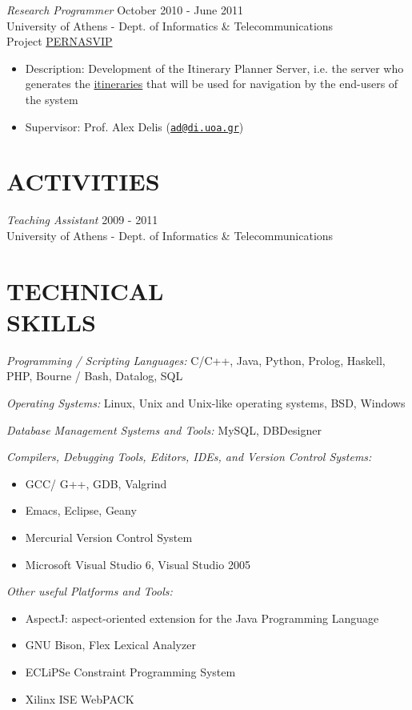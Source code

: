 \documentclass[margin]{res}
\begin{document}
\begin{resume}
        {\sl Research Programmer} \hfill October 2010 - June 2011 \\
        University of Athens - Dept. of Informatics \& Telecommunications \\
        Project \href{http://pernasvip.di.uoa.gr/index.php}{PERNASVIP}
        \begin{itemize}
        \item Description: Development of the Itinerary Planner Server, i.e. the server who
          generates the 
          \href{http://pernasvip.di.uoa.gr/index.php/gen-spef/itinerary-example}{itineraries} 
          that will be used for navigation by the end-users of the system
        \item Supervisor: Prof. Alex Delis
          (\href{mailto:ad@di.uoa.gr}{\nolinkurl{ad@di.uoa.gr}})
        \end{itemize}

\section{ACTIVITIES}
        {\sl Teaching Assistant} \hfill 2009 - 2011 \\
        University of Athens - Dept. of Informatics \& Telecommunications

\section{TECHNICAL \\ SKILLS}
        {\sl Programming / Scripting Languages:} 
        C/C++, Java, Python, Prolog, Haskell, PHP, Bourne / Bash, Datalog, SQL

        {\sl Operating Systems:}
        Linux, Unix and Unix-like operating systems, BSD, Windows

        {\sl Database Management Systems and Tools:}
        MySQL, DBDesigner

        {\sl Compilers, Debugging Tools, Editors, IDEs, and Version Control Systems:}
        \begin{itemize}
        \item GCC/ G++, GDB, Valgrind
        \item Emacs, Eclipse, Geany
        \item Mercurial Version Control System
        \item Microsoft Visual Studio 6, Visual Studio 2005
        \end{itemize}

        {\sl Other useful Platforms and Tools:}
        \begin{itemize}
        \item AspectJ: aspect-oriented extension for the Java Programming Language
        \item GNU Bison, Flex Lexical Analyzer
        \item ECLiPSe Constraint Programming System
        \item Xilinx ISE WebPACK
        \end{itemize}


\end{resume}
\end{document}
